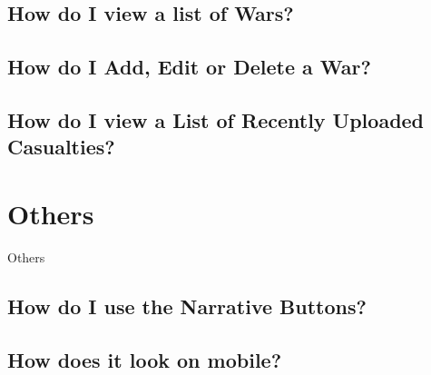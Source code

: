 \documentclass[12pt]{article}
\begin{document}
\subsection{How do I view a list of Wars?}
\subsection{How do I Add, Edit or Delete a War?}
\subsection{How do I view a List of Recently Uploaded Casualties?}

\section{Others}
Others
\subsection{How do I use the Narrative Buttons?}\label{ssec:narrative}
\subsection{How does it look on mobile?}\label{ssec:mobile}
\end{document}

